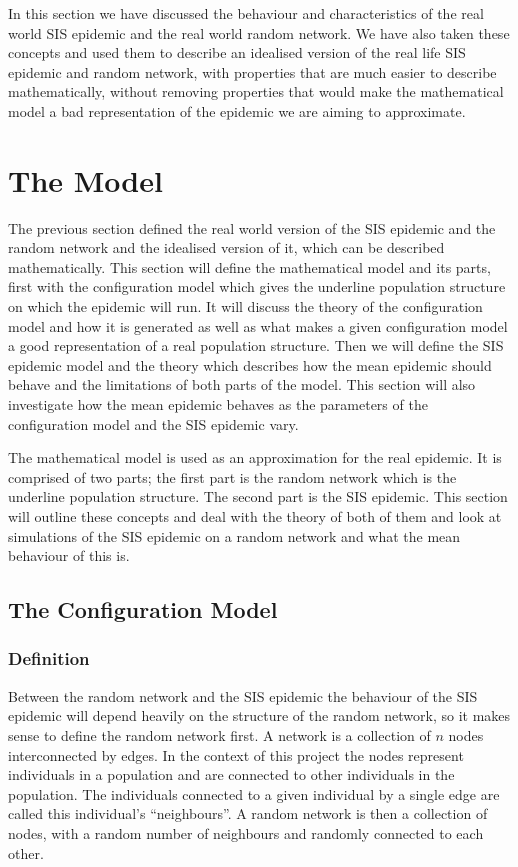 \documentclass{uonmathsreport}
\begin{document}
In this section we have discussed the behaviour and characteristics of the real world SIS epidemic and the real world random network. We have also taken these concepts and used them to describe an idealised version of the real life SIS epidemic and random network, with properties that are much easier to describe mathematically, without removing properties that would make the mathematical model a bad representation of the epidemic we are aiming to approximate.

\newpage
\section{The Model} \label{sec:5}
\indent
The previous section defined the real world version of the SIS epidemic and the random network and the idealised version of it, which can be described mathematically. This section will define the mathematical model and its parts, first with the configuration model which gives the underline population structure on which the epidemic will run. It will discuss the theory of the configuration model and how it is generated as well as what makes a given configuration model a good representation of a real population structure. Then we will define the SIS epidemic model and the theory which describes how the mean epidemic should behave and the limitations of both parts of the model. This section will also investigate how the mean epidemic behaves as the parameters of the configuration model and the SIS epidemic vary.

The mathematical model is used as an approximation for the real epidemic. It is comprised of two parts; the first part is the random network which is the underline population structure. The second part is the SIS epidemic. This section will outline these concepts and deal with the theory of both of them and look at simulations of the SIS epidemic on a random network and what the mean behaviour of this is.

\subsection{The Configuration Model} \label{subsec:5.1}

\subsubsection{Definition} \label{subsub:5.1.1}

Between the random network and the SIS epidemic the behaviour of the SIS epidemic will depend heavily on the structure of the random network, so it makes sense to define the random network first. A network is a collection of $n$ nodes interconnected by edges. In the context of this project the nodes represent individuals in a population and are connected to other individuals in the population. The individuals connected to a given individual by a single edge are called this individual’s “neighbours”. A random network is then a collection of nodes, with a random number of neighbours and randomly connected to each other. 
\end{document}
